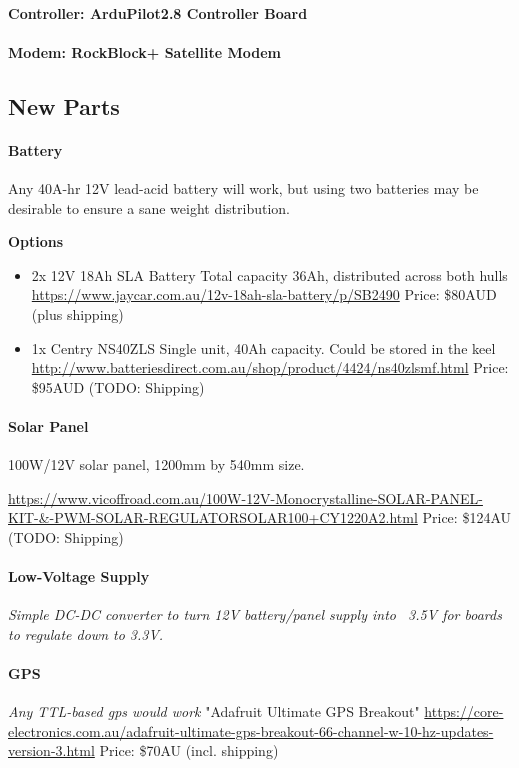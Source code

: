 \paragraph{Controller: ArduPilot2.8 Controller Board}

\paragraph{Modem: RockBlock+ Satellite Modem}

\subsection{New Parts}

\paragraph{Battery}
Any 40A-hr 12V lead-acid battery will work, but using two batteries may be desirable to ensure a sane weight distribution.

\textbf{Options}
\begin{itemize}
\item{2x 12V 18Ah SLA Battery} 
Total capacity 36Ah, distributed across both hulls
\url{https://www.jaycar.com.au/12v-18ah-sla-battery/p/SB2490}
Price: \$80AUD (plus shipping)

\item{1x Centry NS40ZLS}
Single unit, 40Ah capacity. Could be stored in the keel 
\url{http://www.batteriesdirect.com.au/shop/product/4424/ns40zlsmf.html}
Price: \$95AUD (TODO: Shipping)
\end{itemize}

\paragraph{Solar Panel}
100W/12V solar panel, 1200mm by 540mm size. 

\url{https://www.vicoffroad.com.au/100W-12V-Monocrystalline-SOLAR-PANEL-KIT-&-PWM-SOLAR-REGULATORSOLAR100+CY1220A2.html}
Price: \$124AU (TODO: Shipping)

\paragraph{Low-Voltage Supply}
\emph{Simple DC-DC converter to turn 12V battery/panel supply into ~3.5V for boards to regulate down to 3.3V.}

\paragraph{GPS}
\emph{Any TTL-based gps would work}
"Adafruit Ultimate GPS Breakout"
\url{https://core-electronics.com.au/adafruit-ultimate-gps-breakout-66-channel-w-10-hz-updates-version-3.html}
Price: \$70AU (incl. shipping)

